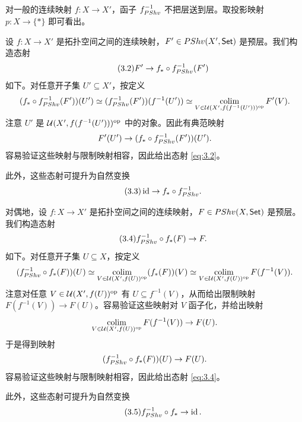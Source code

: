 \begin{warning}\label{warn:3.3.6}
对一般的连续映射 $f\colon X\to X'$，函子 $f_{PShv}^{-1}$ 不把层送到层。取投影映射 $p\colon X\to\{*\}$ 即可看出。
\end{warning}

\begin{construction}\label{con:3.3.7}
设 $f\colon X\to X'$ 是拓扑空间之间的连续映射，$F'\in PShv(X',\mathsf{Set})$ 是预层。我们构造态射
\begin{equation}\tag{3.2}\label{eq:3.2}
F'\to f_*\circ f_{PShv}^{-1}(F')
\end{equation}
如下。对任意开子集 $U'\subseteq X'$，按定义
\[
(f_*\circ f_{PShv}^{-1}(F'))(U')\simeq(f_{PShv}^{-1}(F'))(f^{-1}(U'))\simeq\operatorname*{colim}_{V\in\mathcal U(X',f(f^{-1}(U')))^{\mathrm{op}}}F'(V).
\]
注意 $U'$ 是 $\mathcal U(X',f(f^{-1}(U')))^{\mathrm{op}}$ 中的对象。因此有典范映射
\[
F'(U')\to(f_*\circ f_{PShv}^{-1}(F'))(U').
\]
容易验证这些映射与限制映射相容，因此给出态射 \eqref{eq:3.2}。

此外，这些态射可提升为自然变换
\begin{equation}\tag{3.3}\label{eq:3.3}
\operatorname{id}\to f_*\circ f_{PShv}^{-1}.
\end{equation}
\end{construction}

\begin{construction}\label{con:3.3.8}
对偶地，设 $f\colon X\to X'$ 是拓扑空间之间的连续映射，$F\in PShv(X,\mathsf{Set})$ 是预层。我们构造态射
\begin{equation}\tag{3.4}\label{eq:3.4}
f_{PShv}^{-1}\circ f_*(F)\to F.
\end{equation}
如下。对任意开子集 $U\subseteq X$，按定义
\[
(f_{PShv}^{-1}\circ f_*(F))(U)\simeq\operatorname*{colim}_{V\in\mathcal U(X',f(U))^{\mathrm{op}}}(f_*(F))(V)\simeq\operatorname*{colim}_{V\in\mathcal U(X',f(U))^{\mathrm{op}}}F(f^{-1}(V)).
\]
注意对任意 $V\in\mathcal U(X',f(U))^{\mathrm{op}}$ 有 $U\subseteq f^{-1}(V)$，从而给出限制映射 $F(f^{-1}(V))\to F(U)$。容易验证这些映射对 $V$ 函子化，并给出映射
\[
\operatorname*{colim}_{V\in\mathcal U(X',f(U))^{\mathrm{op}}}F(f^{-1}(V))\to F(U).
\]
于是得到映射
\[
(f_{PShv}^{-1}\circ f_*(F))(U)\to F(U).
\]
容易验证这些映射与限制映射相容，因此给出态射 \eqref{eq:3.4}。

此外，这些态射可提升为自然变换
\begin{equation}\tag{3.5}\label{eq:3.5}
f_{PShv}^{-1}\circ f_*\to\operatorname{id}.
\end{equation}
\end{construction}

